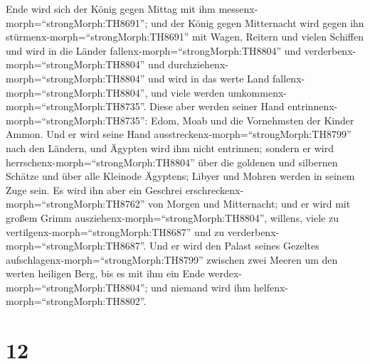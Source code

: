 Ende wird sich der König gegen Mittag mit ihm
messenx-morph=``strongMorph:TH8691''; und der König gegen Mitternacht
wird gegen ihn stürmenx-morph=``strongMorph:TH8691'' mit Wagen, Reitern
und vielen Schiffen und wird in die Länder
fallenx-morph=``strongMorph:TH8804'' und
verderbenx-morph=``strongMorph:TH8804'' und
durchziehenx-morph=``strongMorph:TH8804''  und wird in das
werte Land fallenx-morph=``strongMorph:TH8804'', und viele werden
umkommenx-morph=``strongMorph:TH8735''. Diese aber werden seiner Hand
entrinnenx-morph=``strongMorph:TH8735'': Edom, Moab und die Vornehmsten
der Kinder Ammon.  Und er wird seine Hand
ausstreckenx-morph=``strongMorph:TH8799'' nach den Ländern, und Ägypten
wird ihm nicht entrinnen;  sondern er wird
herrschenx-morph=``strongMorph:TH8804'' über die goldenen und silbernen
Schätze und über alle Kleinode Ägyptens; Libyer und Mohren werden in
seinem Zuge sein.  Es wird ihn aber ein Geschrei
erschreckenx-morph=``strongMorph:TH8762'' von Morgen und Mitternacht;
und er wird mit großem Grimm ausziehenx-morph=``strongMorph:TH8804'',
willens, viele zu vertilgenx-morph=``strongMorph:TH8687'' und zu
verderbenx-morph=``strongMorph:TH8687''.  Und er wird den
Palast seines Gezeltes aufschlagenx-morph=``strongMorph:TH8799''
zwischen zwei Meeren um den werten heiligen Berg, bis es mit ihm ein
Ende werdex-morph=``strongMorph:TH8804''; und niemand wird ihm
helfenx-morph=``strongMorph:TH8802''.

\hypertarget{section-11}{%
\section{12}\label{section-11}}

